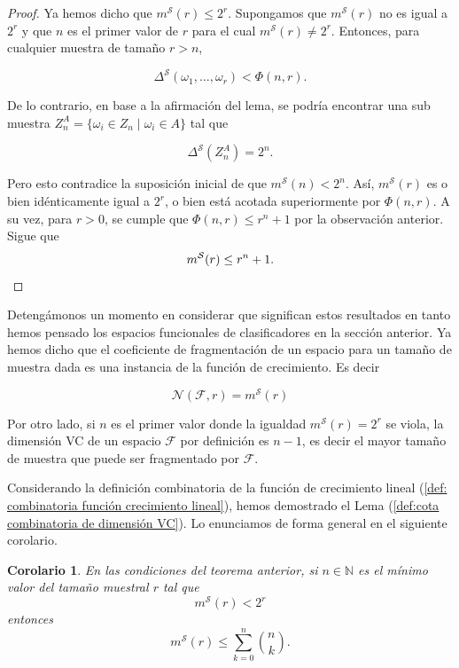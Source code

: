 \documentclass{report}
\newtheorem{cor}{Corolario}[thm]
\begin{document}
\begin{proof}
Ya hemos dicho que \( m^{\mathcal{S}}(r) \leq 2^r \). Supongamos que \( m^{\mathcal{S}}(r) \) no es 
 igual a \( 2^r \) y que \( n \) es el primer valor de \( r \) para el cual \( m^{\mathcal{S}}(r) \neq 2^r \). 
    Entonces, para cualquier muestra de tamaño \( r > n \),
    
    \[
    \Delta^{\mathcal{S}}(\omega_1, \dots, \omega_r) < \Phi(n, r).
    \]
    
    De lo contrario, en base a la afirmación del lema, se podría encontrar una sub muestra  
    \( Z_n^A = \{\omega_i \in Z_n \mid \omega_i \in A\} \) tal que  
    
    \[
    \Delta^{\mathcal{S}}\left(Z_n^A\right) = 2^n.
    \]
    
  Pero esto contradice la suposición inicial de que \( m^{\mathcal{S}}(n) < 2^n \).  
    Así, \( m^{\mathcal{S}}(r) \) es o bien idénticamente igual a \( 2^r \), o bien está acotada superiormente 
    por \( \Phi(n, r) \). A su vez, para \( r > 0 \), se cumple que \( \Phi(n, r) \leq r^n + 1 \) por la observación
    anterior. Sigue que 
    \[
        m^{\mathcal{S}}(r)   \leq r^n + 1.\newline
    \]
    
\end{proof}


Detengámonos un momento en considerar que significan estos resultados en tanto hemos pensado los espacios funcionales
de clasificadores en la sección anterior. Ya hemos dicho que el coeficiente de fragmentación de un espacio para un tamaño
de muestra dada es una instancia de la función de crecimiento. Es decir

\[
\mathcal{N}(\mathcal{F}, r) = m^{\mathcal{S}}(r)
\]

Por otro lado, si $n$ es el primer valor donde la igualdad $m^{\mathcal{S}}(r)=2^r$ se viola, la dimensión VC de un espacio $\mathcal{F}$ 
por definición es $n-1$, es decir el mayor tamaño de muestra que puede ser fragmentado por $\mathcal{F}$.\newline

Considerando la definición combinatoria de la función de crecimiento lineal (\ref{def: combinatoria función crecimiento lineal}),
hemos demostrado el Lema (\ref{def:cota combinatoria de dimensión VC}). Lo enunciamos de forma general en el siguiente corolario.

\begin{cor}
    En las condiciones del teorema anterior, si $n\in\mathbb{N}$ es el mínimo valor del tamaño muestral $r$ tal que    
    \[
        m^{\mathcal{S}}(r) < 2^r
    \]
    entonces
    \[
        m^{\mathcal{S}}(r) \leq \sum\limits_{k=0}^{n} \binom{n}{k}. 
    \]
\end{cor}
\end{document}
